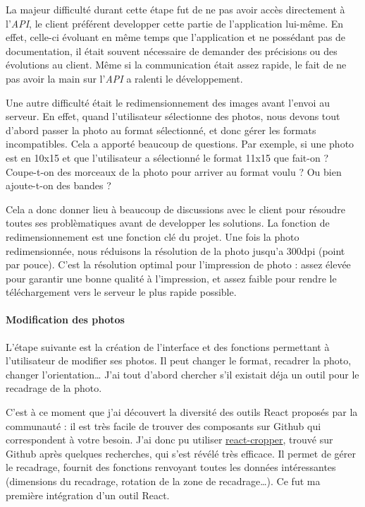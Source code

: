 \documentclass[12pt,a4paper]{article}
\begin{document}
  \bigskip

  La majeur difficulté durant cette étape fut de ne pas avoir accès
  directement à l'\emph{API}, le client préférent developper cette partie
  de l'application lui-même. En effet, celle-ci évoluant en même temps que
  l'application et ne possédant pas de documentation, il était souvent
  nécessaire de demander des précisions ou des évolutions au client. Même
  si la communication était assez rapide, le fait de ne pas avoir la main
  sur l'\emph{API} a ralenti le développement.

  \bigskip

  Une autre difficulté était le redimensionnement des images avant l'envoi
  au serveur. En effet, quand l'utilisateur sélectionne des photos, nous
  devons tout d'abord passer la photo au format sélectionné, et donc gérer
  les formats incompatibles. Cela a apporté beaucoup de questions. Par
  exemple, si une photo est en 10x15 et que l'utilisateur a sélectionné le
  format 11x15 que fait-on ? Coupe-t-on des morceaux de la photo pour
  arriver au format voulu ? Ou bien ajoute-t-on des bandes ?

  \bigskip

  Cela a donc donner lieu à beaucoup de discussions avec le client pour
  résoudre toutes ses problèmatiques avant de developper les solutions. La
  fonction de redimensionnement est une fonction clé du projet. Une fois
  la photo redimensionnée, nous réduisons la résolution de la photo
  jusqu'a 300dpi (point par pouce). C'est la résolution optimal pour
  l'impression de photo : assez élevée pour garantir une bonne qualité à
  l'impression, et assez faible pour rendre le téléchargement vers le
  serveur le plus rapide possible.

  \bigskip

  \paragraph{Modification des photos}\label{modification-des-photos}

  \bigskip

  L'étape suivante est la création de l'interface et des fonctions
  permettant à l'utilisateur de modifier ses photos. Il peut changer le
  format, recadrer la photo, changer l'orientation\ldots{} J'ai tout
  d'abord chercher s'il existait déja un outil pour le recadrage de la
  photo.

  \bigskip

  C'est à ce moment que j'ai découvert la diversité des outils React
  proposés par la communauté : il est très facile de trouver des
  composants sur Github qui correspondent à votre besoin. J'ai donc pu
  utiliser
  \href{https://github.com/roadmanfong/react-cropper}{react-cropper},
  trouvé sur Github après quelques recherches, qui s'est révélé très
  efficace. Il permet de gérer le recadrage, fournit des fonctions
  renvoyant toutes les données intéressantes (dimensions du recadrage,
  rotation de la zone de recadrage\ldots{}). Ce fut ma première
  intégration d'un outil React.
\end{document}
